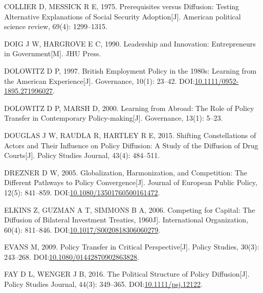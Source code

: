\documentclass[
  12pt,
]{ctexart}
\newlength{\cslhangindent}
\newlength{\cslentryspacingunit} %
\newenvironment{CSLReferences}[2] %
 {%
  \setlength{\parindent}{0pt}
  \ifodd #1
  \let\oldpar\par
  \def\par{\hangindent=\cslhangindent\oldpar}
  \fi
  \setlength{\parskip}{#2\cslentryspacingunit}
 }%
 {}
\begin{document}
\begin{CSLReferences}{1}{0}
\leavevmode{}%
COLLIER D, MESSICK R E, 1975. Prerequisites versus Diffusion: {Testing} Alternative Explanations of Social Security Adoption{[}J{]}. American political science review, 69(4): 1299--1315.

\leavevmode{}%
DOIG J W, HARGROVE E C, 1990. Leadership and Innovation: {Entrepreneurs} in Government{[}M{]}. {JHU Press}.

\leavevmode{}%
DOLOWITZ D P, 1997. British {Employment Policy} in the 1980s: {Learning} from the {American Experience}{[}J{]}. Governance, 10(1): 23--42. DOI:\href{https://doi.org/10.1111/0952-1895.271996027}{10.1111/0952-1895.271996027}.

\leavevmode{}%
DOLOWITZ D P, MARSH D, 2000. Learning from Abroad: {The} Role of Policy Transfer in Contemporary Policy-making{[}J{]}. Governance, 13(1): 5--23.

\leavevmode{}%
DOUGLAS J W, RAUDLA R, HARTLEY R E, 2015. Shifting Constellations of Actors and Their Influence on Policy Diffusion: {A} Study of the Diffusion of Drug Courts{[}J{]}. Policy Studies Journal, 43(4): 484--511.

\leavevmode{}%
DREZNER D W, 2005. Globalization, Harmonization, and Competition: The Different Pathways to Policy Convergence{[}J{]}. Journal of European Public Policy, 12(5): 841--859. DOI:\href{https://doi.org/10.1080/13501760500161472}{10.1080/13501760500161472}.

\leavevmode{}%
ELKINS Z, GUZMAN A T, SIMMONS B A, 2006. Competing for {Capital}: {The Diffusion} of {Bilateral Investment Treaties}, 1960\textendash 2000{[}J{]}. International Organization, 60(4): 811--846. DOI:\href{https://doi.org/10.1017/S0020818306060279}{10.1017/S0020818306060279}.

\leavevmode{}%
EVANS M, 2009. Policy Transfer in Critical Perspective{[}J{]}. Policy Studies, 30(3): 243--268. DOI:\href{https://doi.org/10.1080/01442870902863828}{10.1080/01442870902863828}.

\leavevmode{}%
FAY D L, WENGER J B, 2016. The {Political Structure} of {Policy Diffusion}{[}J{]}. Policy Studies Journal, 44(3): 349--365. DOI:\href{https://doi.org/10.1111/psj.12122}{10.1111/psj.12122}.


\end{CSLReferences}
\end{document}
